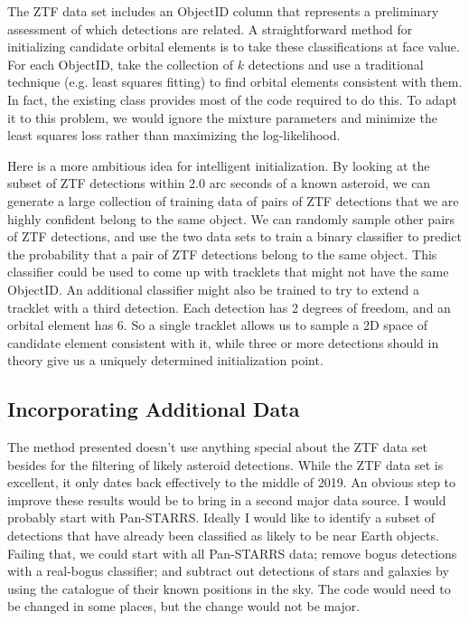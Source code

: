 The ZTF data set includes an ObjectID column that represents a preliminary assessment of which detections are related.
A straightforward method for initializing candidate orbital elements is to take these classifications at face value.
For each ObjectID, take the collection of $k$ detections and use a traditional technique (e.g. least squares fitting) to find orbital elements consistent with them.
In fact, the existing  class provides most of the code required to do this.
To adapt it to this problem, we would ignore the mixture parameters and minimize the least squares loss rather than maximizing the log-likelihood.

Here is a more ambitious idea for intelligent initialization.
By looking at the subset of ZTF detections within 2.0 arc seconds of a known asteroid, we can generate a large collection of training data
of pairs of ZTF detections that we are highly confident belong to the same object.
We can randomly sample other pairs of ZTF detections, and use the two data sets to train a binary classifier to predict 
the probability that a pair of ZTF detections belong to the same object.
This classifier could be used to come up with tracklets that might not have the same ObjectID.
An additional classifier might also be trained to try to extend a tracklet with a third detection.
Each detection has 2 degrees of freedom, and an orbital element has 6.
So a single tracklet allows us to sample a 2D space of candidate element consistent with it,
while three or more detections should in theory give us a uniquely determined initialization point.

\subsection{Incorporating Additional Data}
The method presented doesn't use anything special about the ZTF data set besides for the filtering of likely asteroid detections.
While the ZTF data set is excellent, it only dates back effectively to the middle of 2019.
An obvious step to improve these results would be to bring in a second major data source.
I would probably start with Pan-STARRS.
Ideally I would like to identify a subset of detections that have already been classified as likely to be near Earth objects.
Failing that, we could start with all Pan-STARRS data; remove bogus detections with a real-bogus classifier;
and subtract out detections of stars and galaxies by using the catalogue of their known positions in the sky.
The code would need to be changed in some places, but the change would not be major.

